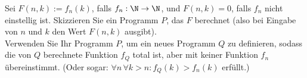 
\begin{exercise}[206]

Sei $F(n,k) := f_n(k)$, falls $f_n: \N \to \N$, und $F(n,k) = 0$, falls $f_n$
nicht einstellig ist. Skizzieren Sie ein Programm $P$, das $F$ berechnet
(also bei Eingabe von $n$ und $k$ den Wert $F(n,k)$ ausgibt). \\


Verwenden Sie Ihr Programm $P$, um ein neues Programm $Q$ zu definieren, sodass
die von $Q$ berechnete Funktion $f_Q$ total ist, aber mit keiner Funktion $f_n$
übereinstimmt. (Oder sogar: $\forall n\,\forall k > n: f_Q(k) > f_n(k)$ erfüllt.)
\end{exercise}


